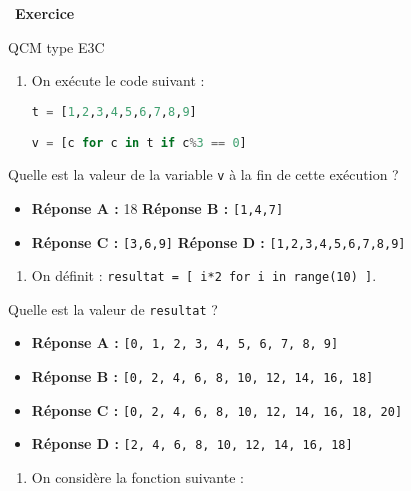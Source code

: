 \documentclass[
  10pt,
]{article}
\newcommand{\passthrough}[1]{#1}
\providecommand{\tightlist}{%
  \setlength{\itemsep}{0pt}\setlength{\parskip}{0pt}}
\newcounter{exo}
\newenvironment{exercice}[1]
{\par \medskip   \addtocounter{exo}{1} \noindent  
\begin{bclogo}[arrondi =0.1,   noborder = true, logo=\bccrayon, marge=4]{~\textbf{Exercice} \textbf{\theexo} {\itshape #1} }  \par}
{
\end{bclogo}
 \par \bigskip }
\newcounter{def}
\begin{document}
\begin{exercice}{}

QCM type E3C

\begin{enumerate}
\def\labelenumi{\arabic{enumi}.}
\item
  On exécute le code suivant :

\begin{lstlisting}[language=Python]
t = [1,2,3,4,5,6,7,8,9]

v = [c for c in t if c%3 == 0]
\end{lstlisting}
\end{enumerate}

Quelle est la valeur de la variable \passthrough{\lstinline!v!} à la fin
de cette exécution ?

\begin{itemize}
\tightlist
\item
  \textbf{Réponse A :} 18 \textbf{Réponse B :}
  \passthrough{\lstinline![1,4,7]!}
\item
  \textbf{Réponse C :} \passthrough{\lstinline![3,6,9]!} \textbf{Réponse
  D :} \passthrough{\lstinline![1,2,3,4,5,6,7,8,9]!}
\end{itemize}

\begin{enumerate}
\def\labelenumi{\arabic{enumi}.}
\setcounter{enumi}{1}
\tightlist
\item
  On définit :
  \passthrough{\lstinline!resultat = [ i*2 for i in range(10) ]!}.
\end{enumerate}

Quelle est la valeur de \passthrough{\lstinline!resultat!} ?

\begin{itemize}
\tightlist
\item
  \textbf{Réponse A :}
  \passthrough{\lstinline![0, 1, 2, 3, 4, 5, 6, 7, 8, 9]!}
\item
  \textbf{Réponse B :}
  \passthrough{\lstinline![0, 2, 4, 6, 8, 10, 12, 14, 16, 18]!}
\item
  \textbf{Réponse C :}
  \passthrough{\lstinline![0, 2, 4, 6, 8, 10, 12, 14, 16, 18, 20]!}
\item
  \textbf{Réponse D :}
  \passthrough{\lstinline![2, 4, 6, 8, 10, 12, 14, 16, 18]!}
\end{itemize}

\begin{enumerate}
\def\labelenumi{\arabic{enumi}.}
\setcounter{enumi}{2}
\tightlist
\item
  On considère la fonction suivante :
\end{enumerate}


\end{exercice}
\end{document}
